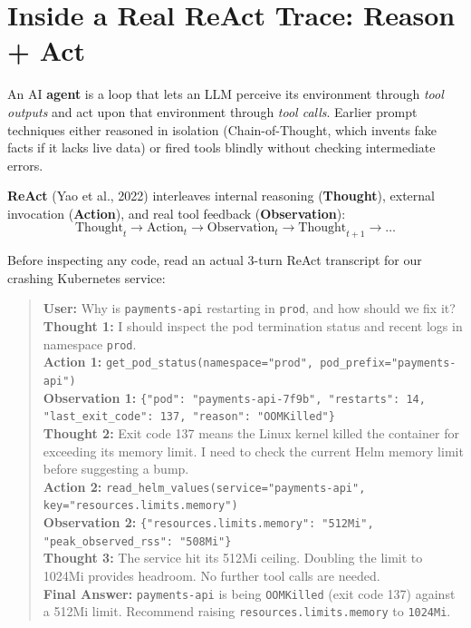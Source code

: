 \section{Inside a Real ReAct Trace: Reason + Act}

An AI \textbf{agent} is a loop that lets an LLM perceive its environment through \emph{tool outputs} and act upon that environment through \emph{tool calls}. Earlier prompt techniques either reasoned in isolation (Chain-of-Thought, which invents fake facts if it lacks live data) or fired tools blindly without checking intermediate errors.

\textbf{ReAct} (Yao et al., 2022) interleaves internal reasoning (\textbf{Thought}), external invocation (\textbf{Action}), and real tool feedback (\textbf{Observation}):
\begin{equation}
\text{Thought}_t \longrightarrow \text{Action}_t \longrightarrow \text{Observation}_t \longrightarrow \text{Thought}_{t+1} \longrightarrow \dots
\end{equation}

Before inspecting any code, read an actual 3-turn ReAct transcript for our crashing Kubernetes service:
\begin{quote}\small
\textbf{User:} Why is \texttt{payments-api} restarting in \texttt{prod}, and how should we fix it?\\[4pt]
\textbf{Thought 1:} I should inspect the pod termination status and recent logs in namespace \texttt{prod}.\\
\textbf{Action 1:} \texttt{get\_pod\_status(namespace="prod", pod\_prefix="payments-api")}\\
\textbf{Observation 1:} \texttt{\{"pod": "payments-api-7f9b", "restarts": 14, "last\_exit\_code": 137, "reason": "OOMKilled"\}}\\[4pt]
\textbf{Thought 2:} Exit code 137 means the Linux kernel killed the container for exceeding its memory limit. I need to check the current Helm memory limit before suggesting a bump.\\
\textbf{Action 2:} \texttt{read\_helm\_values(service="payments-api", key="resources.limits.memory")}\\
\textbf{Observation 2:} \texttt{\{"resources.limits.memory": "512Mi", "peak\_observed\_rss": "508Mi"\}}\\[4pt]
\textbf{Thought 3:} The service hit its 512Mi ceiling. Doubling the limit to 1024Mi provides headroom. No further tool calls are needed.\\
\textbf{Final Answer:} \texttt{payments-api} is being \texttt{OOMKilled} (exit code 137) against a 512Mi limit. Recommend raising \texttt{resources.limits.memory} to \texttt{1024Mi}.
\end{quote}

